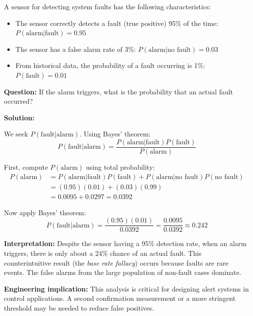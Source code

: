 \begin{examplebox}[title=Example: Computing Conditional Probability with Bayes' Theorem]
A sensor for detecting system faults has the following characteristics:
\begin{itemize}
    \item The sensor correctly detects a fault (true positive) 95\% of the time: $P(\text{alarm}|\text{fault}) = 0.95$
    \item The sensor has a false alarm rate of 3\%: $P(\text{alarm}|\text{no fault}) = 0.03$
    \item From historical data, the probability of a fault occurring is 1\%: $P(\text{fault}) = 0.01$
\end{itemize}

\textbf{Question:} If the alarm triggers, what is the probability that an actual fault occurred?

\textbf{Solution:}

We seek $P(\text{fault}|\text{alarm})$. Using Bayes' theorem:
\begin{equation*}
P(\text{fault}|\text{alarm}) = \frac{P(\text{alarm}|\text{fault})P(\text{fault})}{P(\text{alarm})}
\end{equation*}

First, compute $P(\text{alarm})$ using total probability:
\begin{align*}
P(\text{alarm}) &= P(\text{alarm}|\text{fault})P(\text{fault}) + P(\text{alarm}|\text{no fault})P(\text{no fault}) \\
&= (0.95)(0.01) + (0.03)(0.99) \\
&= 0.0095 + 0.0297 = 0.0392
\end{align*}

Now apply Bayes' theorem:
\begin{equation*}
P(\text{fault}|\text{alarm}) = \frac{(0.95)(0.01)}{0.0392} = \frac{0.0095}{0.0392} \approx 0.242
\end{equation*}

\textbf{Interpretation:} Despite the sensor having a 95\% detection rate, when an alarm triggers, there is only about a 24\% chance of an actual fault. This counterintuitive result (the \textit{base rate fallacy}) occurs because faults are rare events. The false alarms from the large population of non-fault cases dominate.

\textbf{Engineering implication:} This analysis is critical for designing alert systems in control applications. A second confirmation measurement or a more stringent threshold may be needed to reduce false positives.
\end{examplebox}

